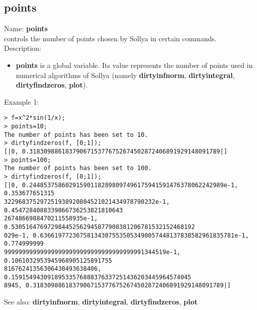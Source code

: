 \subsection{ points }
\noindent Name: \textbf{points}\\
controls the number of points chosen by Sollya in certain commands.\\

\noindent Description: \begin{itemize}

\item \textbf{points} is a global variable. Its value represents the number of points
   used in numerical algorithms of Sollya (namely \textbf{dirtyinfnorm},
   \textbf{dirtyintegral}, \textbf{dirtyfindzeros}, \textbf{plot}).
\end{itemize}
\noindent Example 1: 
\begin{center}\begin{minipage}{15cm}\begin{Verbatim}[frame=single]
> f=x^2*sin(1/x);
> points=10;
The number of points has been set to 10.
> dirtyfindzeros(f, [0;1]);
[|0, 0.31830988618379067153776752674502872406891929148091789|]
> points=100;
The number of points has been set to 100.
> dirtyfindzeros(f, [0;1]);
[|0, 0.244853758602915901182898097496175941591476378062242989e-1, 0.353677651315
322968375297251938920804521021434978790232e-1, 0.4547284088339866736253821810643
2674866988470211558935e-1, 0.530516476972984452562945877908381206781532152468192
029e-1, 0.636619772367581343075535053490057448137838582961835781e-1, 0.774999999
999999999999999999999999999999999999991344519e-1, 0.1061032953945968905125891755
81676241356306430493638406, 0.15915494309189533576888376337251436203445964574045
8945, 0.31830988618379067153776752674502872406891929148091789|]
\end{Verbatim}
\end{minipage}\end{center}
See also: \textbf{dirtyinfnorm}, \textbf{dirtyintegral}, \textbf{dirtyfindzeros}, \textbf{plot}
